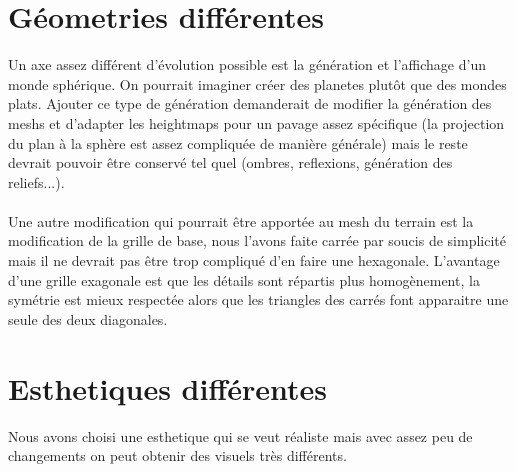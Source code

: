 \documentclass{EPUProjetDi}
\begin{document}
\section{Géometries différentes}

Un axe assez différent d'évolution possible est la génération et l'affichage d'un monde sphérique. On pourrait imaginer créer des planetes plutôt que des mondes plats. Ajouter ce type de génération demanderait de modifier la génération des meshs et d'adapter les heightmaps pour un pavage assez spécifique (la projection du plan à la sphère est assez compliquée de manière générale) mais le reste devrait pouvoir être conservé tel quel (ombres, reflexions, génération des reliefs...).

\paragraph{}
Une autre modification qui pourrait être apportée au mesh du terrain est la modification de la grille de base, nous l'avons faite carrée par soucis de simplicité mais il ne devrait pas être trop compliqué d'en faire une hexagonale. L'avantage d'une grille exagonale est que les détails sont répartis plus homogènement, la symétrie est mieux respectée alors que les triangles des carrés font apparaitre une seule des deux diagonales.

\section{Esthetiques différentes}

Nous avons choisi une esthetique qui se veut réaliste mais avec assez peu de changements on peut obtenir des visuels très différents.
\end{document}
